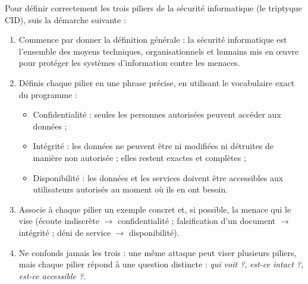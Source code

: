 \documentclass[11pt]{article}
\newcommand{\cle}[1]{{\popxbold\color{popdark}#1}}
\begin{document}
\begin{methode}
Pour définir correctement les trois piliers de la sécurité informatique (le triptyque \cle{CID}), suis la démarche suivante :
\begin{enumerate}
  \item Commence par donner la définition générale : la \cle{sécurité informatique} est l'ensemble des moyens techniques, organisationnels et humains mis en œuvre pour protéger les systèmes d'information contre les menaces.
  \item Définis chaque pilier en une phrase précise, en utilisant le vocabulaire exact du programme :
  \begin{itemize}
    \item \cle{Confidentialité} : seules les personnes autorisées peuvent accéder aux données ;
    \item \cle{Intégrité} : les données ne peuvent être ni modifiées ni détruites de manière non autorisée ; elles restent exactes et complètes ;
    \item \cle{Disponibilité} : les données et les services doivent être accessibles aux utilisateurs autorisés au moment où ils en ont besoin.
  \end{itemize}
  \item Associe à chaque pilier un exemple concret et, si possible, la menace qui le vise (écoute indiscrète $\to$ confidentialité ; falsification d'un document $\to$ intégrité ; déni de service $\to$ disponibilité).
  \item Ne confonds jamais les trois : une même attaque peut viser plusieurs piliers, mais chaque pilier répond à une question distincte : \emph{qui voit ?}, \emph{est-ce intact ?}, \emph{est-ce accessible ?}.
\end{enumerate}
\end{methode}
\end{document}
